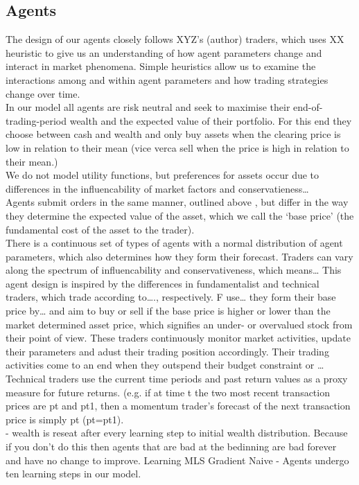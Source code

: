\documentclass[11pt]{article}
\begin{document}
\subsection{Agents}
The design of our agents closely follows XYZ’s (author) traders, which uses XX heuristic to give us an understanding of how agent parameters change and interact in market phenomena. Simple heuristics allow us to examine the interactions among and within agent parameters and how trading strategies change over time. \\
In our model all agents are risk neutral and seek to maximise their end-of-trading-period wealth and the expected value of their portfolio. For this end they choose between cash and wealth and only buy assets when the clearing price is low in relation to their mean (vice verca sell when the price is high in relation to their mean.) \\
We do not model utility functions, but preferences for assets occur due to differences in the influencability of market factors and conservatieness… \\
Agents submit orders in the same manner, outlined above , but differ in the way they determine the expected value of the asset, which we call the ‘base price’ (the fundamental cost of the asset to the trader).  \\
There is a continuous set of types of agents with a normal distribution of agent parameters, which also determines how they form their forecast. Traders can vary along the spectrum of influencability and conservativeness, which means… This agent design is inspired by the differences in fundamentalist and technical traders, which trade according to…., respectively. F use… they form their base price by… and aim to buy or sell if the base price is higher or lower than the market determined asset price, which signifies an under- or overvalued stock from their point of view. These traders continuously monitor market activities, update their parameters and adust their trading position accordingly. Their trading activities come to an end when they outspend their budget constraint or … \\
Technical traders use the current time periods and past return values as a proxy measure for future returns. (e.g. if at time t the two most recent transaction prices are pt and pt1, then a momentum trader's forecast of the next transaction price is simply pt (pt=pt1).  \\
- wealth is reseat after every learning step to initial wealth distribution. Because if you don't do this then agents that are bad at the bedinning are bad forever and have no change to improve. 
Learning	
MLS
Gradient
Naive
- Agents undergo ten learning steps in our model. 
\end{document}
